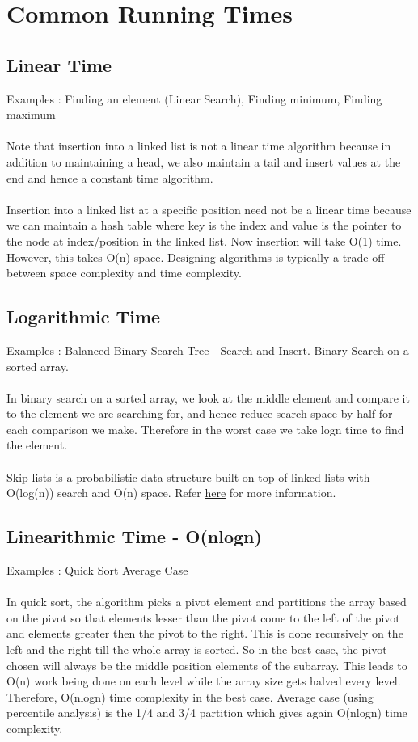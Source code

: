\section{Common Running Times}

\subsection{Linear Time}
Examples : Finding an element (Linear Search), Finding minimum, Finding maximum
\\\\Note that insertion into a linked list is not a linear time algorithm because in addition to maintaining a head, we also maintain a tail and insert values at the end and hence a constant time algorithm.
\\\\Insertion into a linked list at a specific position need not be a linear time because we can maintain a hash table where key is the index and value is the pointer to the node at index/position in the linked list. Now insertion will take O(1) time. However, this takes O(n) space. Designing algorithms is typically a trade-off between space complexity and time complexity. 

\subsection{Logarithmic Time}
Examples : Balanced Binary Search Tree - Search and Insert. Binary Search on a sorted array.
\\\\In binary search on a sorted array, we look at the middle element and compare it to the element we are searching for, and hence reduce search space by half for each comparison we make. Therefore in the worst case we take logn time to find the element.
\\\\Skip lists is a probabilistic data structure built on top of linked lists with O(log(n)) search and O(n) space. Refer \href{https://brilliant.org/wiki/skip-lists/}{here} for more information.

\subsection{Linearithmic Time - O(nlogn)}
Examples : Quick Sort Average Case
\\\\In quick sort, the algorithm picks a pivot element and partitions the array based on the pivot so that elements lesser than the pivot come to the left of the pivot and elements greater then the pivot to the right. This is done recursively on the left and the right till the whole array is sorted. So in the best case, the pivot chosen will always be the middle position elements of the subarray. This leads to O(n) work being done on each level while the array size gets halved every level. Therefore, O(nlogn) time complexity in the best case. Average case (using percentile analysis) is the 1/4 and 3/4 partition which gives again O(nlogn) time complexity.

